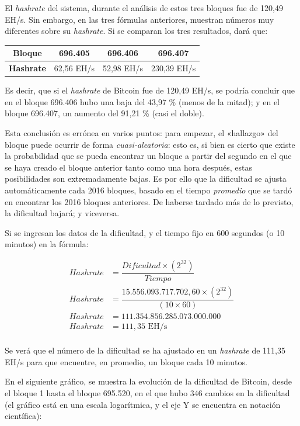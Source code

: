 \documentclass[12pt,a4paper,twoside]{book}
\begin{document}
El \textit{hashrate} del sistema, durante el análisis de estos tres bloques fue de 120,49 EH/s. Sin embargo, en las tres fórmulas anteriores, muestran números muy diferentes sobre su \textit{hashrate}. Si se comparan los tres resultados, dará que:

\begin{center}
\begin{tabular}{|c|c|c|c|}
\hline 
\textbf{Bloque} & 696.405 & 696.406 & 696.407 \\ 
\hline 
\textbf{Hashrate} & 62,56 EH/s & 52,98 EH/s & 230,39 EH/s \\ 
\hline 
\end{tabular} 
\end{center}

Es decir, que si el \textit{hashrate} de Bitcoin fue de 120,49 EH/s, se podría concluir que en el bloque 696.406 hubo una baja del 43,97 \% (menos de la mitad); y en el bloque 696.407, un aumento del 91,21 \% (casi el doble).

Esta conclusión es errónea en varios puntos: para empezar, el «hallazgo» del bloque puede ocurrir de forma \textit{cuasi-aleatoria}: esto es, si bien es cierto que existe la probabilidad que se pueda encontrar un bloque a partir del segundo en el que se haya creado el bloque anterior tanto como una hora después, estas posibilidades son extremadamente bajas. Es por ello que la dificultad se ajusta automáticamente cada 2016 bloques, basado en el tiempo \textit{promedio} que se tardó en encontrar los 2016 bloques anteriores. De haberse tardado más de lo previsto, la dificultad bajará; y viceversa.

Si se ingresan los datos de la dificultad, y el tiempo fijo en 600 segundos (o 10 minutos) en la fórmula:

\begin{align*}
Hashrate &= \dfrac{Dificultad \times \left( 2^{32} \right)}{Tiempo} \\
Hashrate &= \dfrac{15.556.093.717.702,60 \times \left( 2^{32} \right)}{\left( 10 \times 60 \right)} \\
Hashrate &= 111.354.856.285.073.000.000 \\
Hashrate &= 111,35 \text{ EH/s} \\
\end{align*} 

Se verá que el número de la dificultad se ha ajustado en un \textit{hashrate} de 111,35 EH/s para que encuentre, en promedio, un bloque cada 10 minutos.

En el siguiente gráfico, se muestra la evolución de la dificultad de Bitcoin, desde el bloque 1 hasta el bloque 695.520, en el que hubo 346 cambios en la dificultad (el gráfico está en una escala logarítmica, y el eje Y se encuentra en notación científica):
\end{document}
